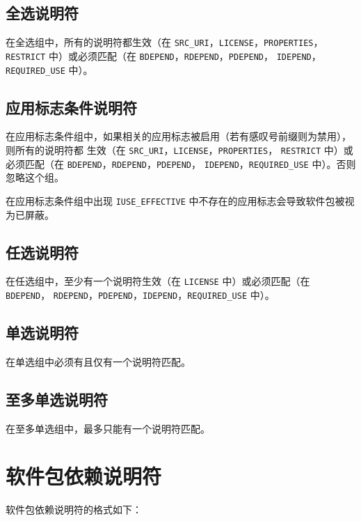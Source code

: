 \subsection{全选说明符}

在全选组中，所有的说明符都生效（在 \texttt{SRC_URI}，\texttt{LICENSE}，\texttt{PROPERTIES}，
\texttt{RESTRICT} 中）或必须匹配（在 \texttt{BDEPEND}，\texttt{RDEPEND}，\texttt{PDEPEND}，
\texttt{IDEPEND}，\texttt{REQUIRED_USE} 中）。

\subsection{应用标志条件说明符}

在应用标志条件组中，如果相关的应用标志被启用（若有感叹号前缀则为禁用），则所有的说明符都
生效（在 \texttt{SRC_URI}，\texttt{LICENSE}，\texttt{PROPERTIES}，
\texttt{RESTRICT} 中）或必须匹配（在 \texttt{BDEPEND}，\texttt{RDEPEND}，\texttt{PDEPEND}，
\texttt{IDEPEND}，\texttt{REQUIRED_USE} 中）。否则忽略这个组。

在应用标志条件组中出现 \texttt{IUSE_EFFECTIVE} 中不存在的应用标志会导致软件包被视为已屏蔽。

\subsection{任选说明符}

在任选组中，至少有一个说明符生效（在 \texttt{LICENSE} 中）或必须匹配（在 \texttt{BDEPEND}，
\texttt{RDEPEND}，\texttt{PDEPEND}，\texttt{IDEPEND}，\texttt{REQUIRED_USE} 中）。

\subsection{单选说明符}

在单选组中必须有且仅有一个说明符匹配。

\subsection{至多单选说明符}

在至多单选组中，最多只能有一个说明符匹配。

\section{软件包依赖说明符}
\label{sec:package-dependency-spec}

软件包依赖说明符的格式如下：

